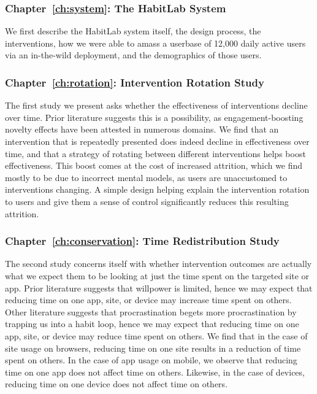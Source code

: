 
\subsubsection{Chapter~\ref{ch:system}: The HabitLab System}

We first describe the HabitLab system itself, the design process, the interventions, how we were able to amass a userbase of 12,000 daily active users via an in-the-wild deployment, and the demographics of those users.

\subsubsection{Chapter~\ref{ch:rotation}: Intervention Rotation Study}

The first study we present asks whether the effectiveness of interventions decline over time. Prior literature suggests this is a possibility, as engagement-boosting novelty effects have been attested in numerous domains. We find that an intervention that is repeatedly presented does indeed decline in effectiveness over time, and that a strategy of rotating between different interventions helps boost effectiveness. This boost comes at the cost of increased attrition, which we find mostly to be due to incorrect mental models, as users are unaccustomed to interventions changing. A simple design helping explain the intervention rotation to users and give them a sense of control significantly reduces this resulting attrition.

\subsubsection{Chapter~\ref{ch:conservation}: Time Redistribution Study}

The second study concerns itself with whether intervention outcomes are actually what we expect them to be looking at just the time spent on the targeted site or app. Prior literature suggests that willpower is limited, hence we may expect that reducing time on one app, site, or device may increase time spent on others. Other literature suggests that procrastination begets more procrastination by trapping us into a habit loop, hence we may expect that reducing time on one app, site, or device may reduce time spent on others. We find that in the case of site usage on browsers, reducing time on one site results in a reduction of time spent on others. In the case of app usage on mobile, we observe that reducing time on one app does not affect time on others. Likewise, in the case of devices, reducing time on one device does not affect time on others.


